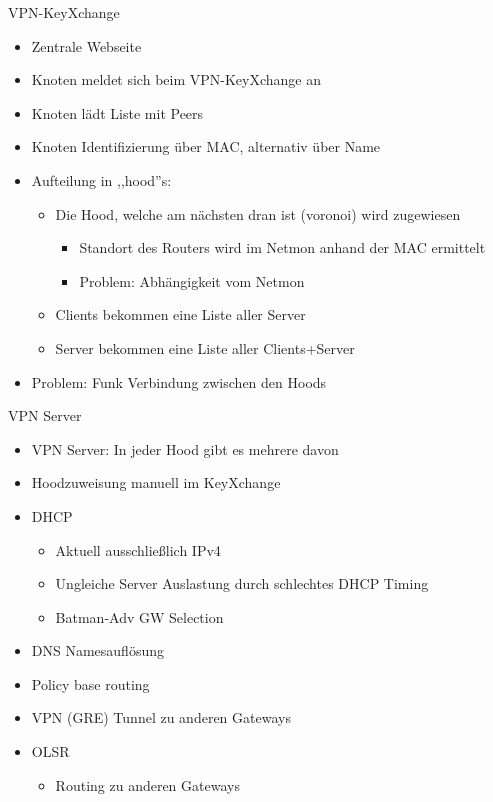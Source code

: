 \begin{frame}{VPN-KeyXchange}
    \begin{itemize}
        \item Zentrale Webseite
        \item Knoten meldet sich beim VPN-KeyXchange an
        \item Knoten lädt Liste mit Peers
        \item Knoten Identifizierung über MAC, alternativ über Name
        \item<2> Aufteilung in ,,hood''s:
        \begin{itemize}
            \item Die Hood, welche am nächsten dran ist (voronoi) wird zugewiesen
            \begin{itemize}
                \item Standort des Routers wird im Netmon anhand der MAC ermittelt
                \item Problem: Abhängigkeit vom Netmon
            \end{itemize}
            \item Clients bekommen eine Liste aller Server
            \item Server bekommen eine Liste aller Clients+Server
        \end{itemize}
        \item<2> Problem: Funk Verbindung zwischen den Hoods
    \end{itemize}
\end{frame}

\begin{frame}{VPN Server}
    \begin{itemize}
        \item VPN Server: In jeder Hood gibt es mehrere davon
        \item Hoodzuweisung manuell im KeyXchange
        \item DHCP
        \begin{itemize}
            \item Aktuell ausschließlich IPv4
            \item Ungleiche Server Auslastung durch schlechtes DHCP Timing
            \item Batman-Adv GW Selection
        \end{itemize}
        \item DNS Namesauflösung
        \item Policy base routing
        \item VPN (GRE) Tunnel zu anderen Gateways
        \item OLSR
        \begin{itemize}
            \item Routing zu anderen Gateways
        \end{itemize}
    \end{itemize}
\end{frame}

